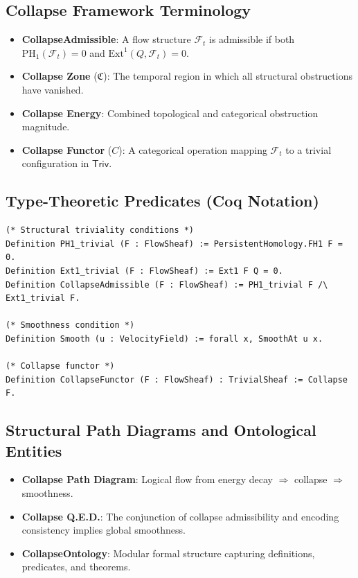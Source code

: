 \documentclass[11pt]{article}
\begin{document}
\subsection*{Collapse Framework Terminology}

\begin{itemize}
  \item \textbf{CollapseAdmissible}: A flow structure $\mathcal{F}_t$ is admissible if both $\mathrm{PH}_1(\mathcal{F}_t) = 0$ and $\mathrm{Ext}^1(Q, \mathcal{F}_t) = 0$.
  \item \textbf{Collapse Zone} ($\mathfrak{C}$): The temporal region in which all structural obstructions have vanished.
  \item \textbf{Collapse Energy}: Combined topological and categorical obstruction magnitude.
  \item \textbf{Collapse Functor} ($C$): A categorical operation mapping $\mathcal{F}_t$ to a trivial configuration in $\mathsf{Triv}$.
\end{itemize}

\subsection*{Type-Theoretic Predicates (Coq Notation)}

\begin{lstlisting}[language=Coq, caption={Collapse Q.E.D. Predicates}]
(* Structural triviality conditions *)
Definition PH1_trivial (F : FlowSheaf) := PersistentHomology.FH1 F = 0.
Definition Ext1_trivial (F : FlowSheaf) := Ext1 F Q = 0.
Definition CollapseAdmissible (F : FlowSheaf) := PH1_trivial F /\ Ext1_trivial F.

(* Smoothness condition *)
Definition Smooth (u : VelocityField) := forall x, SmoothAt u x.

(* Collapse functor *)
Definition CollapseFunctor (F : FlowSheaf) : TrivialSheaf := Collapse F.
\end{lstlisting}

\subsection*{Structural Path Diagrams and Ontological Entities}

\begin{itemize}
  \item \textbf{Collapse Path Diagram}: Logical flow from energy decay $\Rightarrow$ collapse $\Rightarrow$ smoothness.
  \item \textbf{Collapse Q.E.D.}: The conjunction of collapse admissibility and encoding consistency implies global smoothness.
  \item \textbf{CollapseOntology}: Modular formal structure capturing definitions, predicates, and theorems.
\end{itemize}
\end{document}
